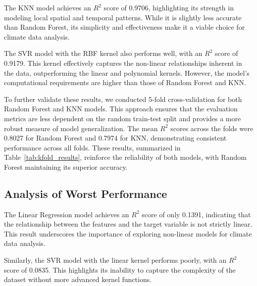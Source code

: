\documentclass[conference]{IEEEtran}
\begin{document}
The KNN model achieves an \(R^2\) score of 0.9706, highlighting its strength in modeling local spatial and temporal patterns. While it is slightly less accurate than Random Forest, its simplicity and effectiveness make it a viable choice for climate data analysis.

The SVR model with the RBF kernel also performs well, with an \(R^2\) score of 0.9179. This kernel effectively captures the non-linear relationships inherent in the data, outperforming the linear and polynomial kernels. However, the model's computational requirements are higher than those of Random Forest and KNN.

To further validate these results, we conducted 5-fold cross-validation for both Random Forest and KNN models. This approach ensures that the evaluation metrics are less dependent on the random train-test split and provides a more robust measure of model generalization. The mean \(R^2\) scores across the folds were 0.8027 for Random Forest and 0.7974 for KNN, demonstrating consistent performance across all folds. These results, summarized in Table~\ref{tab:kfold_results}, reinforce the reliability of both models, with Random Forest maintaining its superior accuracy.

\begin{table}[h]
\centering
\caption{5-Fold Cross-Validation \(R^2\) Scores}
\label{tab:kfold_results}
\end{table}

\subsection{Analysis of Worst Performance}
The Linear Regression model achieves an \(R^2\) score of only 0.1391, indicating that the relationship between the features and the target variable is not strictly linear. This result underscores the importance of exploring non-linear models for climate data analysis.

Similarly, the SVR model with the linear kernel performs poorly, with an \(R^2\) score of 0.0835. This highlights its inability to capture the complexity of the dataset without more advanced kernel functions.
\end{document}
